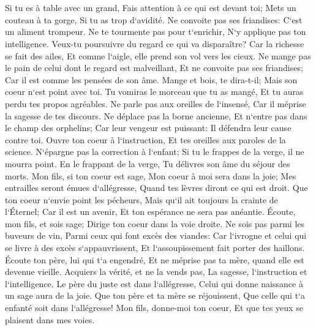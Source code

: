 \chapter{}

\verse Si tu es à table avec un grand, Fais attention à ce qui est devant toi; 
\verse Mets un couteau à ta gorge, Si tu as trop d`avidité. 
\verse Ne convoite pas ses friandises: C`est un aliment trompeur. 
\verse Ne te tourmente pas pour t`enrichir, N`y applique pas ton intelligence. 
\verse Veux-tu poursuivre du regard ce qui va disparaître? Car la richesse se fait des ailes, Et comme l`aigle, elle prend son vol vers les cieux. 
\verse Ne mange pas le pain de celui dont le regard est malveillant, Et ne convoite pas ses friandises; 
\verse Car il est comme les pensées de son âme. Mange et bois, te dira-t-il; Mais son coeur n`est point avec toi. 
\verse Tu vomiras le morceau que tu as mangé, Et tu auras perdu tes propos agréables. 
\verse Ne parle pas aux oreilles de l`insensé, Car il méprise la sagesse de tes discours. 
\verse Ne déplace pas la borne ancienne, Et n`entre pas dans le champ des orphelins; 
\verse Car leur vengeur est puissant: Il défendra leur cause contre toi. 
\verse Ouvre ton coeur à l`instruction, Et tes oreilles aux paroles de la science. 
\verse N`épargne pas la correction à l`enfant; Si tu le frappes de la verge, il ne mourra point. 
\verse En le frappant de la verge, Tu délivres son âme du séjour des morts. 
\verse Mon fils, si ton coeur est sage, Mon coeur à moi sera dans la joie; 
\verse Mes entrailles seront émues d`allégresse, Quand tes lèvres diront ce qui est droit. 
\verse Que ton coeur n`envie point les pécheurs, Mais qu`il ait toujours la crainte de l`Éternel; 
\verse Car il est un avenir, Et ton espérance ne sera pas anéantie. 
\verse Écoute, mon fils, et sois sage; Dirige ton coeur dans la voie droite. 
\verse Ne sois pas parmi les buveurs de vin, Parmi ceux qui font excès des viandes: 
\verse Car l`ivrogne et celui qui se livre à des excès s`appauvrissent, Et l`assoupissement fait porter des haillons. 
\verse Écoute ton père, lui qui t`a engendré, Et ne méprise pas ta mère, quand elle est devenue vieille. 
\verse Acquiers la vérité, et ne la vends pas, La sagesse, l`instruction et l`intelligence. 
\verse Le père du juste est dans l`allégresse, Celui qui donne naissance à un sage aura de la joie. 
\verse Que ton père et ta mère se réjouissent, Que celle qui t`a enfanté soit dans l`allégresse! 
\verse Mon fils, donne-moi ton coeur, Et que tes yeux se plaisent dans mes voies. 
